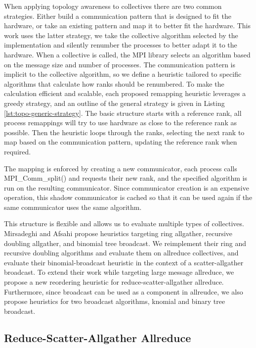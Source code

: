 When applying topology awareness to collectives there are two common strategies.
Either build a communication pattern that is designed to fit the hardware, or take an existing pattern and map it to better fit the hardware.
This work uses the latter strategy, we take the collective algorithm selected by the implementation and silently renumber the processes to better adapt it to the hardware.
When a collective is called, the MPI library selects an algorithm based on the message size and number of processes.
The communication pattern is implicit to the collective algorithm, so we define a heuristic tailored to specific algorithms that calculate how ranks should be renumbered.
To make the calculation efficient and scalable, each proposed remapping heuristic leverages a greedy strategy, and an outline of the general strategy is given in Listing \ref{lst:topo-generic-strategy}.
The basic structure starts with a reference rank, all process remappings will try to use hardware as close to the reference rank as possible.
Then the heuristic loops through the ranks, selecting the next rank to map based on the communication pattern, updating the reference rank when required.

The mapping is enforced by creating a new communicator, each process calls MPI\_Comm\_split() and requests their new rank, and the specified algorithm is run on the resulting communicator.
Since communicator creation is an expensive operation, this shadow communicator is cached so that it can be used again if the same communicator uses the same algorithm.

This structure is flexible and allows us to evaluate multiple types of collectives.
Mirsadeghi and Afsahi \cite{Mirsadeghi2016TopoAwareCollRR} propose heuristics targeting ring allgather, recursive doubling allgather, and binomial tree broadcast. 
We reimplement their ring and recursive doubling algorithms and evaluate them on allreduce collectives, and evaluate their binomial-broadcast heuristic in the context of a scatter-allgather broadcast.
To extend their work while targeting large message allreduce, we propose a new reordering heuristic for reduce-scatter-allgather allreduce.
Furthermore, since broadcast can be used as a component in allreudce, we also propose heuristics for two broadcast algorithms, knomial and binary tree broadcast.

\subsection{Reduce-Scatter-Allgather Allreduce}

